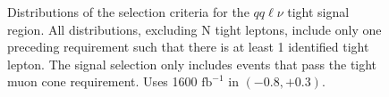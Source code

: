 \begin{figure}[htpb]%
\caption{ Distributions of the selection criteria for the $qq\ell\nu$ tight signal region. All distributions, excluding N tight leptons, include only one preceding requirement such that there is at least 1 identified tight lepton. The signal selection only includes events that pass the tight muon cone requirement. Uses 1600 $\text{fb}^{-1}$ in $(-0.8,+0.3)$.}
\centering
    \begin{minipage}{0.49\textwidth}
        \centering
    \end{minipage}\hfill
    \begin{minipage}{0.49\textwidth}
\end{minipage}
\end{figure}
